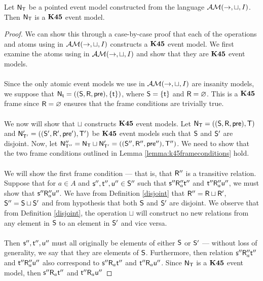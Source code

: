 \begin{lemma} \label{lemma:onlyK45Models}
	Let $\evM_\evT$ be a pointed event model constructed from the language $\EM(\to,\sqcup,I)$.
	Then $\evM_\evT$ is a $\AXKFF$ event model.
\end{lemma}
\begin{proof}
	We can show this through a case-by-case proof that each of the operations and atoms using in
	$\EM(\to,\sqcup,I)$ constructs a $\AXKFF$ event model.
	We first examine the atoms using in $\EM(\to,\sqcup,I)$ and show that they are $\AXKFF$ event
	models.\\
	\\
	Since the only atomic event models we use in $\EM(\to,\sqcup,I)$ are insanity models, we suppose
	that $\evM_{\evt} = ((\evS,\evR,\evpr),\{\evt\})$, where $\evS = \{\evt\}$ and $\evR =
	\varnothing$.
	This is a $\AXKFF$ frame since $\evR = \varnothing$ ensures that the frame conditions
	are trivially true.\\
	\\
	We now will show that $\sqcup$ constructs $\AXKFF$ event models.
	Let $\evM_\evT = ((\evS,\evR,\evpr),\evT)$ and $\evM'_{\evT'} = ((\evS',\evR',\evpr'),\evT')$ be
	$\AXKFF$ event models such that $\evS$ and $\evS'$ are disjoint.
	Now, let $\evM''_{\evT''} = \evM_\evT \sqcup \evM'_{\evT'} = ((\evS'',\evR'',\evpr''),\evT'')$.
	We need to show that the two frame conditions outlined in Lemma \ref{lemma:k45frameconditions}
	hold.\\
	\\
	We will show the first frame condition --- that is, that $\evR''$ is a transitive relation.
	Suppose that for $a \in A$ and $\evs'', \evt'', \evu'' \in \evS''$ such that $\evs'' \evR''_a
	\evt''$ and $\evt'' \evR''_a \evu''$, we must show that $\evs'' \evR''_a \evu''$.
	We have from Definition \ref{disjoint} that $\evR'' = \evR \sqcup \evR'$, $\evS'' = \evS \sqcup
	\evS'$ and from hypothesis that both $\evS$ and $\evS'$ are disjoint.
	We observe that from Definition \ref{disjoint}, the operation $\sqcup$ will construct no new
	relations from any element in $\evS$ to an element in $\evS'$ and vice versa.\\
	\\
	Then $\evs'', \evt'', \evu''$ must all originally be elements of either $\evS$ or $\evS'$ ---
	without loss of generality, we say that they are elements of $\evS$.
	Furthermore, then relation $\evs'' \evR''_a \evt''$ and $\evt'' \evR''_a \evu''$ also correspond
	to $\evs'' \evR_a \evt''$ and $\evt'' \evR_a \evu''$.
	Since $\evM_\evT$ is a $\AXKFF$ event model, then $\evs'' \evR_a \evt''$ and $\evt'' \evR_a \evu''$

\end{proof}
